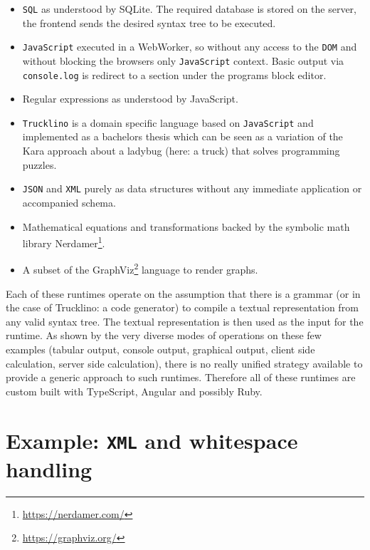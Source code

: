 \documentclass[sigconf,natbib=false]{acmart}
\begin{document}
\begin{itemize}
\item \texttt{SQL} as understood by SQLite. The required database is stored on the server, the frontend sends the desired syntax tree to be executed.

\item \texttt{JavaScript} executed in a WebWorker, so without any access to the \texttt{DOM} and without blocking the browsers only \texttt{JavaScript} context. Basic output via \texttt{console.log} is redirect to a section under the programs block editor.

\item Regular expressions as understood by JavaScript.

\item \texttt{Trucklino} is a domain specific language based on \texttt{Java\-Script} and implemented as a bachelors thesis \cite{popp_konzeption_2019} which can be seen as a variation of the Kara approach\cite{hartmann_kara_2001} about a ladybug (here: a truck) that solves programming puzzles.

\item \texttt{JSON} and \texttt{XML} purely as data structures without any immediate application or accompanied schema.

\item Mathematical equations and transformations backed by the symbolic math library Nerdamer\footnote{\url{https://nerdamer.com/}}.

\item A subset of the GraphViz\footnote{\url{https://graphviz.org/}} language to render graphs.
\end{itemize}

Each of these runtimes operate on the assumption that there is a grammar (or in the case of Trucklino: a code generator) to compile a textual representation from any valid syntax tree. The textual representation is then used as the input for the runtime. As shown by the very diverse modes of operations on these few examples (tabular output, console output, graphical output, client side calculation, server side calculation), there is no really unified strategy available to provide a generic approach to such runtimes. Therefore all of these runtimes are custom built with TypeScript, Angular and possibly Ruby.

\section{Example: \texttt{XML} and whitespace handling}
\end{document}
